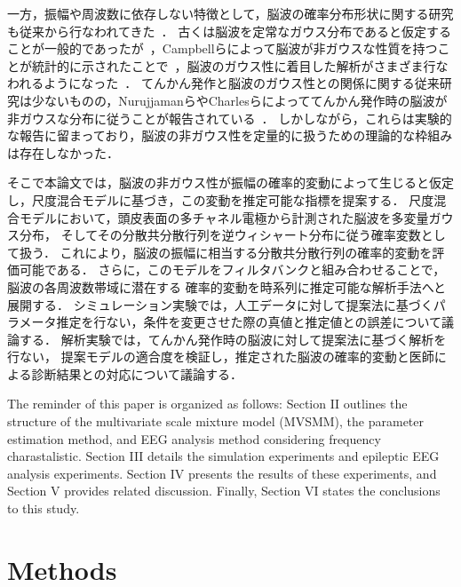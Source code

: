 \documentclass[journal]{IEEEtran}
\begin{document}
一方，振幅や周波数に依存しない特徴として，脳波の確率分布形状に関する研究も従来から行なわれてきた~\cite{Sounders1963,Gonen2012,Campbell1967,Weiss1973,Nurujjaman2009,Charles1999}．
古くは脳波を定常なガウス分布であると仮定することが一般的であったが~\cite{Sounders1963,Gonen2012}，Campbellらによって脳波が非ガウスな性質を持つことが統計的に示されたことで~\cite{Campbell1967}，脳波のガウス性に着目した解析がさまざま行なわれるようになった~\cite{Gonen2012,Weiss1973,Nurujjaman2009,Charles1999}．
てんかん発作と脳波のガウス性との関係に関する従来研究は少ないものの，NurujjamanらやCharlesらによっててんかん発作時の脳波が非ガウスな分布に従うことが報告されている~\cite{Nurujjaman2009,Charles1999}．
しかしながら，これらは実験的な報告に留まっており，脳波の非ガウス性を定量的に扱うための理論的な枠組みは存在しなかった．

そこで本論文では，脳波の非ガウス性が振幅の確率的変動によって生じると仮定し，尺度混合モデルに基づき，この変動を推定可能な指標を提案する．
尺度混合モデルにおいて，頭皮表面の多チャネル電極から計測された脳波を多変量ガウス分布，
そしてその分散共分散行列を逆ウィシャート分布に従う確率変数として扱う．
これにより，脳波の振幅に相当する分散共分散行列の確率的変動を評価可能である．
さらに，このモデルをフィルタバンクと組み合わせることで，脳波の各周波数帯域に潜在する
確率的変動を時系列に推定可能な解析手法へと展開する．
シミュレーション実験では，人工データに対して提案法に基づくパラメータ推定を行ない，条件を変更させた際の真値と推定値との誤差について議論する．
解析実験では，てんかん発作時の脳波に対して提案法に基づく解析を行ない，
提案モデルの適合度を検証し，推定された脳波の確率的変動と医師による診断結果との対応について議論する．

The reminder of this paper is organized as follows: Section II outlines the structure of the multivariate scale mixture model (MVSMM), the parameter estimation method, and EEG analysis method considering frequency charastalistic. Section III details the simulation experiments and  epileptic EEG analysis experiments. Section IV presents the results of these experiments, and Section V provides related discussion. Finally, Section VI states the conclusions to this study.

\section{Methods}
\end{document}
